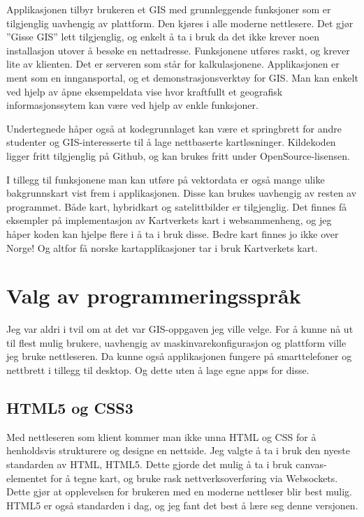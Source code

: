 \documentclass[12pt,twoside,onecolumn]{article}
\begin{document}
	Applikasjonen tilbyr brukeren et GIS med grunnleggende funksjoner som er tilgjenglig uavhengig av plattform. Den kjøres i alle moderne nettlesere. Det gjør ''Gisse GIS'' lett tilgjenglig, og enkelt å ta i bruk da det ikke krever noen installasjon utover å besøke en nettadresse. Funksjonene utføres raskt, og krever lite av klienten. Det er serveren som står for kalkulasjonene. Applikasjonen er ment som en inngansportal, og et demonstrasjonsverktøy for GIS. Man kan enkelt ved hjelp av åpne eksempeldata vise hvor kraftfullt et geografisk informasjonssytem kan være ved hjelp av enkle funksjoner. 
	
	Undertegnede håper også at kodegrunnlaget kan være et springbrett for andre studenter og GIS-interesserte til å lage nettbaserte kartløsninger. Kildekoden ligger fritt tilgjenglig på Github, og kan brukes fritt under OpenSource-lisensen. 
	
	I tillegg til funksjonene man kan utføre på vektordata er også mange ulike bakgrunnskart vist frem i applikasjonen. Disse kan brukes uavhengig av resten av programmet. Både kart, hybridkart og satelittbilder er tilgjenglig. Det finnes få eksempler på implementasjon av Kartverkets kart i websammenheng, og jeg håper koden kan hjelpe flere i å ta i bruk disse. Bedre kart finnes jo ikke over Norge! Og altfor få norske kartapplikasjoner tar i bruk Kartverkets kart. 

\section{Valg av programmeringsspråk}
	
	Jeg var aldri i tvil om at det var GIS-oppgaven jeg ville velge. For å kunne nå ut til flest mulig brukere, uavhengig av maskinvarekonfigurasjon og plattform ville jeg bruke nettleseren. Da kunne også applikasjonen fungere på smarttelefoner og nettbrett i tillegg til desktop. Og dette uten å lage egne apps for disse.
	
	\subsection{HTML5 og CSS3}
		
		Med nettleseren som klient kommer man ikke unna HTML og CSS for å henholdsvis strukturere og designe en nettside. Jeg valgte å ta i bruk den nyeste standarden av HTML, HTML5. Dette gjorde det mulig å ta i bruk canvas-elementet for å tegne kart, og bruke rask nettverksoverføring via Websockets. Dette gjør at opplevelsen for brukeren med en moderne nettleser blir best mulig. HTML5 er også standarden i dag, og jeg fant det best å lære seg denne versjonen.
		
\end{document}
